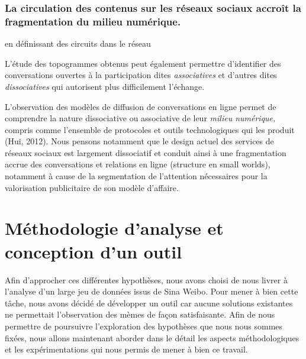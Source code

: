 \subsubsection{La circulation des contenus sur les réseaux sociaux accroît la fragmentation du milieu numérique.}

en définissant des circuits dans le réseau

L'étude des topogrammes obtenus peut également permettre d'identifier des conversations ouvertes à la participation dites \textit{associatives }et d{\textquoteright}autres dites \textit{dissociatives} qui autorisent plus difficilement l{\textquoteright}échange. 

L{\textquoteright}observation des modèles de diffusion de conversations en ligne permet de comprendre la nature dissociative ou associative de leur \textit{milieu numérique, }compris comme l{\textquoteright}ensemble de protocoles et outils technologiques qui les produit (Hui, 2012). Nous pensons notamment que le design actuel des services de réseaux sociaux est largement dissociatif et conduit ainsi à une fragmentation accrue des conversations et relations en ligne (structure en small worlds), notamment à cause de la segmentation de l{\textquoteright}attention nécessaires pour la valorisation publicitaire de son modèle d{\textquoteright}affaire.  


\section{Méthodologie d'analyse et conception d'un outil} 

Afin d{\textquoteright}approcher ces différentes hypothèses, nous avons choisi de nous livrer à l'analyse d'un large jeu de données issus de Sina Weibo. Pour mener à bien cette tâche, nous avons décidé de développer un outil car aucune solutions existantes ne permettait l'observation des mèmes de façon satisfaisante. Afin de nous permettre de poursuivre l'exploration des hypothèses que nous nous sommes fixées, nous allons maintenant aborder dans le détail les aspects méthodologiques et les expérimentations qui nous permis de mener à bien ce travail.